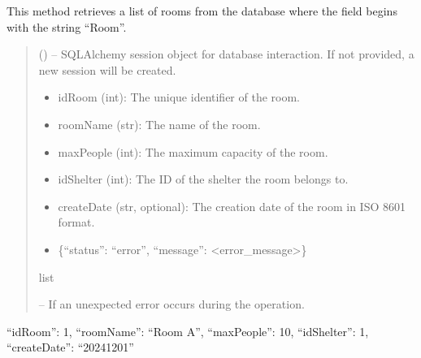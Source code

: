 \documentclass[letterpaper,10pt,english]{sphinxmanual}
\begin{document}
\begin{fulllineitems}
\begin{fulllineitems}
\sphinxAtStartPar
This method retrieves a list of rooms from the database where the  field
begins with the string “Room”.
\begin{quote}\begin{description}
\sphinxAtStartPar
{} (\sphinxstyleliteralemphasis{\sphinxupquote{, }}) – SQLAlchemy session object for database interaction.
If not provided, a new session will be created.

\sphinxAtStartPar
\begin{description}
\begin{itemize}
\item {} 
\sphinxAtStartPar
idRoom (int): The unique identifier of the room.

\item {} 
\sphinxAtStartPar
roomName (str): The name of the room.

\item {} 
\sphinxAtStartPar
maxPeople (int): The maximum capacity of the room.

\item {} 
\sphinxAtStartPar
idShelter (int): The ID of the shelter the room belongs to.

\item {} 
\sphinxAtStartPar
createDate (str, optional): The creation date of the room in ISO 8601 format.

\end{itemize}

\begin{itemize}
\item {} 
\sphinxAtStartPar
\{“status”: “error”, “message”: <error\_message>\}

\end{itemize}

\end{description}


\sphinxAtStartPar
list

\sphinxAtStartPar
{} – If an unexpected error occurs during the operation.

\end{description}\end{quote}
\begin{description}
\begin{description}
\sphinxlineitem{{[}}\begin{description}
\sphinxlineitem{\{}
\sphinxAtStartPar
“idRoom”: 1,
“roomName”: “Room A”,
“maxPeople”: 10,
“idShelter”: 1,
“createDate”: “2024\sphinxhyphen{}12\sphinxhyphen{}01”


\end{description}
\end{description}
\end{description}
\end{fulllineitems}
\end{fulllineitems}
\end{document}
